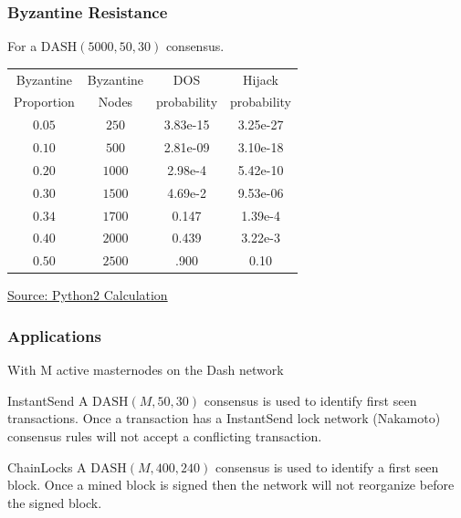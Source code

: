 \documentclass[english,handout]{beamer}
\begin{document}
\begin{frame}
\frametitle{Byzantine Resistance}
For a $\textrm{DASH}(5000,50,30)$ consensus.\\

\begin{center}
\begin{tabular}{|c|c|c|c|}
\hline
Byzantine & Byzantine & DOS  & Hijack \\
Proportion & Nodes & probability & probability\\
\hline
$0.05$ & $250$ & 3.83e-15 & 3.25e-27 \\
\hline
$0.10$ & $500$ & 2.81e-09 &  3.10e-18\\
\hline
$0.20$ & $1000$ & 2.98e-4& 5.42e-10\\
\hline
$0.30$ & $1500$ & 4.69e-2& 9.53e-06 \\
\hline
$0.34$ & $1700$ & 0.147 &  1.39e-4\\
\hline
$0.40$ & $2000$ & 0.439 &  3.22e-3\\
\hline
$0.50$ & $2500$ & .900 &  0.10 \\
\hline
\end{tabular}
\end{center}
\begin{flushright}
\href{https://blog.tappmath.com/pages/script-for-calculating-byzantine-resistance/}{Source: Python2 Calculation}
\end{flushright}
\end{frame}


\begin{frame}
\frametitle{Applications}
With M active masternodes on the Dash network
\vfill

\begin{block}{InstantSend}
A $\textrm{DASH}(M,50,30)$ consensus is used to identify first seen transactions.
Once a transaction has a InstantSend lock network (Nakamoto) consensus rules
will not accept a conflicting transaction.
\end{block}

\vfill

\begin{block}{ChainLocks}
A $\textrm{DASH}(M,400,240)$ consensus is used to identify a first seen block.
Once a mined block is signed then the network will not reorganize
before the signed block.
\end{block}

\vfill

\end{frame}
\end{document}
